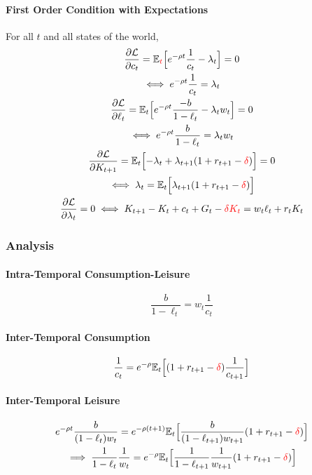 \documentclass[11pt]{article}
\newcommand{\expat}[2]{\mathbb{E}_{#1}\Big[{#2}\Big]}
\begin{document}
			\paragraph{First Order Condition with Expectations}
			For all $t$ and all states of the world,
			\begin{gather}
				\pd{\mc{L}}{c_t} = \expat{\textcolor{red}{t}}{e^{-\rho t}\frac{1}{c_t} - \lambda_t} = 0 \\
				\iff e^{-\rho t} \frac{1}{c_t} = \lambda_t \\
				\pd{\mc{L}}{\ell_t} = \expat{t}{e^{-\rho t} \frac{-b}{1-\ell_t} - \lambda_t w_t} = 0 \\
				\iff e^{-\rho t} \frac{b}{1-\ell_t} = \lambda_t w_t \\
				\pd{\mc{L}}{K_{t+1}} = \expat{t}{-\lambda_t + \lambda_{t+1}(1 + r_{t+1} - \textcolor{red}{\delta})} = 0 \\
				\iff \lambda_t = \expat{t}{\lambda_{t+1}(1+r_{t+1} - \textcolor{red}{\delta})} \\
				\pd{\mc{L}}{\lambda_t} = 0 \iff K_{t+1} - K_t + c_t + G_t - \textcolor{red}{\delta K_t}= w_t \ell_t + r_t K_t
			\end{gather}
		\subsubsection{Analysis}
			\paragraph{Intra-Temporal Consumption-Leisure}
			\begin{equation}
				\frac{b}{1-\ell_t} = w_t\frac{1}{c_t}
			\end{equation}
			
			\paragraph{Inter-Temporal Consumption}
			\begin{equation}
				\frac{1}{c_t} = e^{-\rho} \expat{t}{(1 + r_{t+1} - \textcolor{red}{\delta})\frac{1}{c_{t+1}}}
			\end{equation}
			
			\paragraph{Inter-Temporal Leisure}
			\begin{gather}
				e^{-\rho t} \frac{b}{(1-\ell_t) w_t} = e^{-\rho (t+1)} \expat{t}{\frac{b}{(1-\ell_{t+1})w_{t+1}} (1 + r_{t+1} - \textcolor{red}{\delta})} \\
				\implies \frac{1}{1-\ell_t} \frac{1}{w_t} = e^{-\rho} \expat{t}{\frac{1}{1-\ell_{t+1}}\frac{1}{w_{t+1}} (1 + r_{t+1} - \textcolor{red}{\delta})}
			\end{gather}
\end{document}
